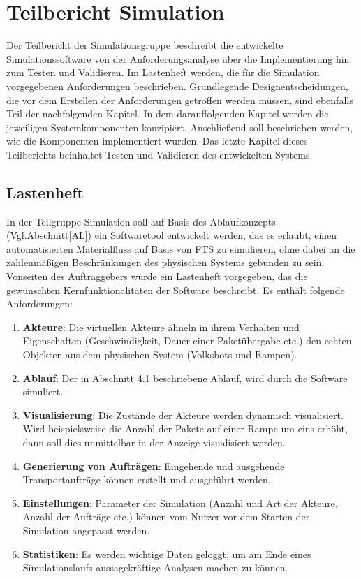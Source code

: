 \section{Teilbericht Simulation}
Der Teilbericht der Simulationsgruppe beschreibt die entwickelte Simulationssoftware von der Anforderungsanalyse über die Implementierung hin zum Testen und Validieren. Im Lastenheft werden, die für die Simulation vorgegebenen Anforderungen beschrieben. Grundlegende Designentscheidungen, die vor dem Erstellen der Anforderungen getroffen werden müssen, sind ebenfalls Teil der nachfolgenden Kapitel. In dem darauffolgenden Kapitel werden die jeweiligen Systemkomponenten konzipiert. Anschließend soll beschrieben werden, wie die Komponenten implementiert wurden. Das letzte Kapitel dieses Teilberichts beinhaltet Testen und Validieren des entwickelten Systems.
\subsection{Lastenheft}
In der Teilgruppe Simulation soll auf Basis des Ablaufkonzepts (Vgl.Abschnitt\ref{AL}) ein Softwaretool entwickelt werden, das es erlaubt, einen automatisierten Materialfluss auf Basis von FTS zu simulieren, ohne dabei an die zahlenmäßigen Beschränkungen des physischen Systems gebunden zu sein. Vonseiten des Auftraggebers wurde ein Lastenheft vorgegeben, das die gewünschten Kernfunktionalitäten der Software beschreibt. Es enthält folgende Anforderungen:
\begin{enumerate}
\item \textbf{Akteure}: Die virtuellen Akteure ähneln in ihrem Verhalten und Eigenschaften (Geschwindigkeit, Dauer einer Paketübergabe etc.) den echten Objekten aus dem physischen System (Volksbots und Rampen).
\item \textbf{Ablauf}: Der in Abschnitt 4.1 beschriebene Ablauf, wird durch die Software simuliert. 
\item \textbf{Visualisierung}: Die Zustände der Akteure werden dynamisch visualisiert. Wird beispielsweise die Anzahl der Pakete auf einer Rampe um eins erhöht, dann soll dies unmittelbar in der Anzeige visualisiert werden.
\item \textbf{Generierung von Aufträgen}: Eingehende und ausgehende Transportaufträge können erstellt und ausgeführt werden. 
\item \textbf{Einstellungen}: Parameter der Simulation (Anzahl und Art der Akteure, Anzahl der Aufträge etc.) können vom Nutzer vor dem Starten der Simulation angepasst werden.
\item \textbf{Statistiken}: Es werden wichtige Daten geloggt, um am Ende eines Simulationslaufs aussagekräftige Analysen  machen zu können.
\end{enumerate}
